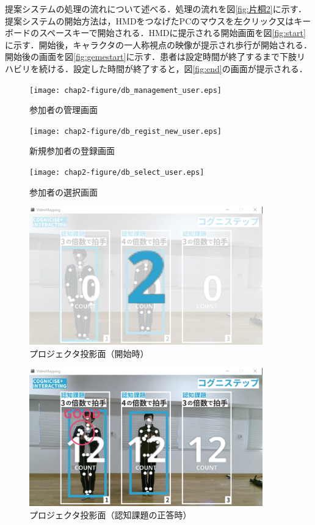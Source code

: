 提案システムの処理の流れについて述べる．処理の流れを図\ref{fig:片桐2}に示す．
提案システムの開始方法は，HMDをつなげたPCのマウスを左クリック又はキーボードのスペースキーで開始される．HMDに提示される開始画面を図\ref{fig:start}に示す．開始後，キャラクタの一人称視点の映像が提示され歩行が開始される．開始後の画面を図\ref{fig:gemestart}に示す．患者は設定時間が終了するまで下肢リハビリを続ける．設定した時間が終了すると，図\ref{fig:end}の画面が提示される．
\fi


\begin{figure}[tbp]
	\centering
			\texttt{[image: chap2-figure/db\_management\_user.eps]}
	\caption{参加者の管理画面}
	\label{fig:db_management_user}
\end{figure}

\begin{figure}[tbp]
	\centering
			\texttt{[image: chap2-figure/db\_regist\_new\_user.eps]}
	\caption{新規参加者の登録画面}
	\label{fig:db_regist_new_user}
\end{figure}

\begin{figure}[tbp]
	\centering
			\texttt{[image: chap2-figure/db\_select\_user.eps]}
	\caption{参加者の選択画面}
	\label{fig:db_select_user}
\end{figure}

\begin{figure}[tbp]
	\centering
			\includegraphics[width=0.9\textwidth]{chap2-figure/vm_start.eps}
	\caption{プロジェクタ投影面（開始時）}
	\label{fig:vm_start}
\end{figure}

\begin{figure}[tbp]
	\centering
			\includegraphics[width=0.9\textwidth]{chap2-figure/vm_clap.eps}
	\caption{プロジェクタ投影面（認知課題の正答時）}
	\label{fig:vm_clap}
\end{figure}

